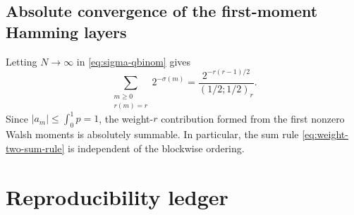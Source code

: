 \documentclass[11pt,oneside]{article}
\theoremstyle{definition}
\theoremstyle{remark}
\begin{document}
\subsection{Absolute convergence of the first-moment Hamming layers}

Letting $N\to\infty$ in \eqref{eq:sigma-qbinom} gives
\begin{equation}\label{eq:infinite-Hamming-sigma}
 \sum_{\substack{m\ge0\\r(m)=r}}2^{-\sigma(m)}
 =\frac{2^{-r(r-1)/2}}{(1/2;1/2)_r}.
\end{equation}
Since $|a_m|\le\int_0^1p=1$, the weight-$r$ contribution formed from the first
nonzero Walsh moments is absolutely summable.  In particular, the sum rule
\eqref{eq:weight-two-sum-rule} is independent of the blockwise ordering.

\section{Reproducibility ledger}
\label{app:ledger}


\end{document}
